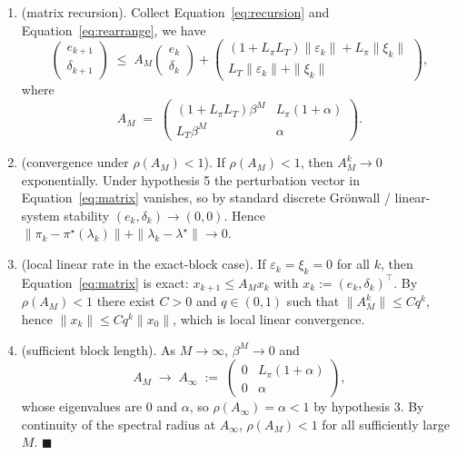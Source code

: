 \documentclass{article}
\begin{document}
\begin{enumerate}
\begin{equation}
\label{eq:rearrange}
\end{equation}
    \item[Step 4] (matrix recursion). Collect Equation~\ref{eq:recursion} and Equation~\ref{eq:rearrange}, we have
\begin{equation}
\label{eq:matrix}
\begin{pmatrix} e_{k+1} \\ \delta_{k+1} \end{pmatrix} \;\le\; A_M \begin{pmatrix} e_k \\ \delta_k \end{pmatrix} + \begin{pmatrix} (1+L_\pi L_T)\|\varepsilon_k\| + L_\pi\|\xi_k\| \\ L_T\|\varepsilon_k\| + \|\xi_k\| \end{pmatrix}, \tag{A.12.4}
\end{equation}
where
$$A_M \;=\; \begin{pmatrix} (1+L_\pi L_T)\beta^M & L_\pi(1+\alpha) \\ L_T\beta^M & \alpha \end{pmatrix}.$$
    \item[Step 5] (convergence under $\rho(A_M) < 1$). If $\rho(A_M) < 1$, then $A_M^k \to 0$ exponentially. Under hypothesis 5 the perturbation vector in Equation~\ref{eq:matrix} vanishes, so by standard discrete Grönwall / linear-system stability $(e_k, \delta_k) \to (0,0)$. Hence $\|\pi_k - \pi^\star(\lambda_k)\| + \|\lambda_k - \lambda^\star\| \to 0$.
    \item[Step 6] (local linear rate in the exact-block case). If $\varepsilon_k = \xi_k = 0$ for all $k$, then Equation~\ref{eq:matrix} is exact: $x_{k+1} \le A_M x_k$ with $x_k := (e_k, \delta_k)^\top$. By $\rho(A_M) < 1$ there exist $C > 0$ and $q \in (0,1)$ such that $\|A_M^k\| \le C q^k$, hence $\|x_k\| \le C q^k \|x_0\|$, which is local linear convergence.
    \item[Step 7] (sufficient block length). As $M \to \infty$, $\beta^M \to 0$ and
$$A_M \;\longrightarrow\; A_\infty \;:=\; \begin{pmatrix} 0 & L_\pi(1+\alpha) \\ 0 & \alpha \end{pmatrix},$$
whose eigenvalues are $0$ and $\alpha$, so $\rho(A_\infty) = \alpha < 1$ by hypothesis 3. By continuity of the spectral radius at $A_\infty$, $\rho(A_M) < 1$ for all sufficiently large $M$. $\blacksquare$
\end{enumerate}
\end{document}
